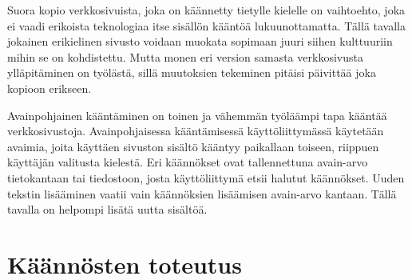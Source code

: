 \documentclass[11pt,a4paper,titlepage,oneside]{article}
\begin{document}
Suora kopio verkkosivuista, joka on käännetty tietylle kielelle
on vaihtoehto, joka ei vaadi erikoista teknologiaa itse sisällön kääntöä lukuunottamatta.
Tällä tavalla jokainen erikielinen sivusto voidaan muokata sopimaan juuri siihen kulttuuriin mihin se on kohdistettu.
Mutta monen eri version samasta verkkosivusta ylläpitäminen on työlästä, sillä muutoksien tekeminen pitäisi päivittää joka kopioon erikseen.
\medskip







Avainpohjainen kääntäminen on toinen ja vähemmän työläämpi tapa kääntää verkkosivustoja.
Avainpohjaisessa kääntämisessä käyttöliittymässä käytetään avaimia, joita käyttäen sivuston sisältö kääntyy paikallaan toiseen, 
riippuen käyttäjän valitusta kielestä.
%
Eri käännökset ovat tallennettuna 
avain-arvo tietokantaan tai tiedostoon,
josta käyttöliittymä etsii halutut käännökset.
Uuden tekstin lisääminen vaatii vain käännöksien lisäämisen avain-arvo kantaan.
Tällä tavalla on helpompi lisätä uutta sisältöä.
\medskip

































\newpage






\section{Käännösten toteutus}
\end{document}
